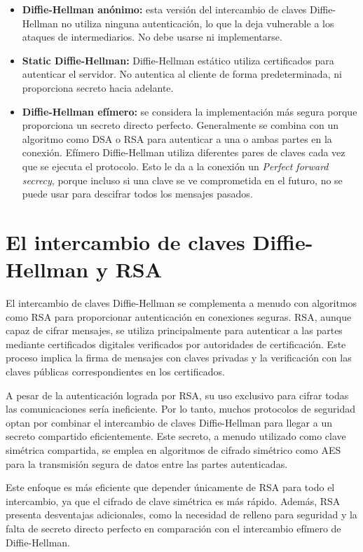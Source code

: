\documentclass[11pt]{article}
\begin{document}
\begin{itemize}
    \item \textbf{Diffie-Hellman anónimo:} esta versión del intercambio de claves Diffie-Hellman no utiliza ninguna autenticación, lo que la deja vulnerable a los ataques de intermediarios. No debe usarse ni implementarse.
    \item \textbf{Static Diffie-Hellman:} Diffie-Hellman estático utiliza certificados para autenticar el servidor. No autentica al cliente de forma predeterminada, ni proporciona secreto hacia adelante.
    \item \textbf{Diffie-Hellman efímero:} se considera la implementación más segura porque proporciona un secreto directo perfecto. Generalmente se combina con un algoritmo como DSA o RSA para autenticar a una o ambas partes en la conexión. Efímero Diffie-Hellman utiliza diferentes pares de claves cada vez que se ejecuta el protocolo. Esto le da a la conexión un \emph{Perfect forward secrecy}, porque incluso si una clave se ve comprometida en el futuro, no se puede usar para descifrar todos los mensajes pasados.\\
\end{itemize}


\section{El intercambio de claves Diffie-Hellman y RSA}

El intercambio de claves Diffie-Hellman se complementa a menudo con algoritmos como RSA para proporcionar autenticación en conexiones seguras. RSA, aunque capaz de cifrar mensajes, se utiliza principalmente para autenticar a las partes mediante certificados digitales verificados por autoridades de certificación. Este proceso implica la firma de mensajes con claves privadas y la verificación con las claves públicas correspondientes en los certificados.

A pesar de la autenticación lograda por RSA, su uso exclusivo para cifrar todas las comunicaciones sería ineficiente. Por lo tanto, muchos protocolos de seguridad optan por combinar el intercambio de claves Diffie-Hellman para llegar a un secreto compartido eficientemente. Este secreto, a menudo utilizado como clave simétrica compartida, se emplea en algoritmos de cifrado simétrico como AES para la transmisión segura de datos entre las partes autenticadas.

Este enfoque es más eficiente que depender únicamente de RSA para todo el intercambio, ya que el cifrado de clave simétrica es más rápido. Además, RSA presenta desventajas adicionales, como la necesidad de relleno para seguridad y la falta de secreto directo perfecto en comparación con el intercambio efímero de Diffie-Hellman.
\end{document}
